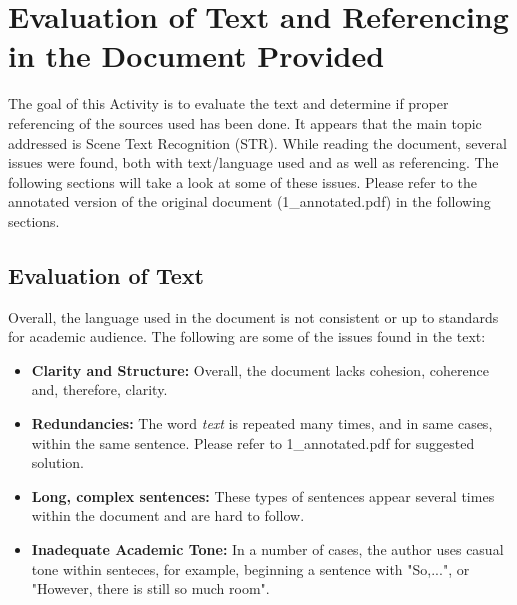 \chapter*{Evaluation of Text and Referencing in the Document Provided}
\label{chap1}

The goal of this Activity is to evaluate the text and determine if proper referencing of the sources used has been done. It appears that the main topic addressed is Scene Text Recognition (STR). While reading the document, several issues were found, both with text/language used and as well as referencing. The following sections will take a look at some of these issues. Please refer to the annotated version of the original document (1\_annotated.pdf) in the following sections.

\section*{Evaluation of Text} 
Overall, the language used in the document is not consistent or up to standards for academic audience. The following are some of the issues found in the text:
\begin{itemize}
    \item \textbf{Clarity and Structure:} Overall, the document lacks cohesion, coherence and, therefore, clarity. 
    \item  \textbf{Redundancies:} The word \textit{text} is repeated many times, and in same cases, within the same sentence. Please refer to 1\_annotated.pdf for suggested solution. 
    \item  \textbf{Long, complex sentences:} These types of sentences appear several times within the document and are hard to follow. 
    \item  \textbf{Inadequate Academic Tone:} In a number of cases, the author uses casual tone within senteces, for example, beginning a sentence with "So,...", or "However, there is still so much room". 
\end{itemize} 


